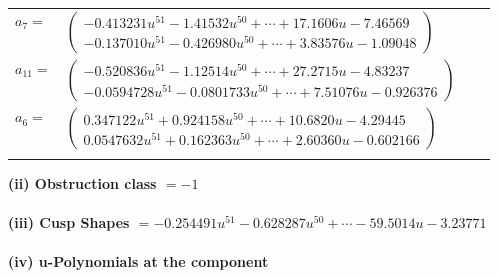 \documentclass[1p]{elsarticle_modified}
\theoremstyle{definition}
\begin{document}
\begin{tabular}{m{7pt} m{180pt} m{7pt} m{180pt} }
\flushright $a_{7}=$&$\begin{pmatrix}-0.413231 u^{51}-1.41532 u^{50}+\cdots+17.1606 u-7.46569\\-0.137010 u^{51}-0.426980 u^{50}+\cdots+3.83576 u-1.09048\end{pmatrix}$ \\
\flushright $a_{11}=$&$\begin{pmatrix}-0.520836 u^{51}-1.12514 u^{50}+\cdots+27.2715 u-4.83237\\-0.0594728 u^{51}-0.0801733 u^{50}+\cdots+7.51076 u-0.926376\end{pmatrix}$ \\
\flushright $a_{6}=$&$\begin{pmatrix}0.347122 u^{51}+0.924158 u^{50}+\cdots+10.6820 u-4.29445\\0.0547632 u^{51}+0.162363 u^{50}+\cdots+2.60360 u-0.602166\end{pmatrix}$\\&\end{tabular}
\flushleft \textbf{(ii) Obstruction class $= -1$}\\~\\
\flushleft \textbf{(iii) Cusp Shapes $= -0.254491 u^{51}-0.628287 u^{50}+\cdots-59.5014 u-3.23771$}\\~\\
\newpage\renewcommand{\arraystretch}{1}
\flushleft \textbf{(iv) u-Polynomials at the component}\newline \\
\end{document}
